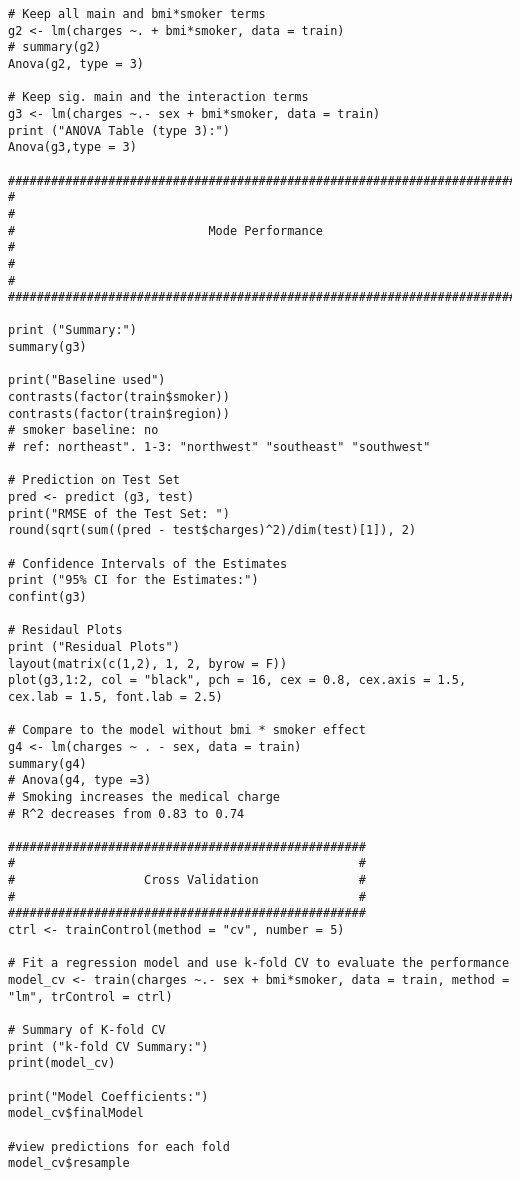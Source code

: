 \documentclass[12pt]{article}
\begin{document}
\begin{verbatim}
# Keep all main and bmi*smoker terms
g2 <- lm(charges ~. + bmi*smoker, data = train)
# summary(g2)
Anova(g2, type = 3)

# Keep sig. main and the interaction terms
g3 <- lm(charges ~.- sex + bmi*smoker, data = train)
print ("ANOVA Table (type 3):")
Anova(g3,type = 3)

#######################################################################
#                                                                     #
#                           Mode Performance                          #
#                                                                     #
#######################################################################

print ("Summary:")
summary(g3)

print("Baseline used")
contrasts(factor(train$smoker))
contrasts(factor(train$region))
# smoker baseline: no
# ref: northeast". 1-3: "northwest" "southeast" "southwest"

# Prediction on Test Set
pred <- predict (g3, test)
print("RMSE of the Test Set: ")
round(sqrt(sum((pred - test$charges)^2)/dim(test)[1]), 2)

# Confidence Intervals of the Estimates
print ("95% CI for the Estimates:")
confint(g3) 

# Residaul Plots
print ("Residual Plots")
layout(matrix(c(1,2), 1, 2, byrow = F)) 
plot(g3,1:2, col = "black", pch = 16, cex = 0.8, cex.axis = 1.5, 
cex.lab = 1.5, font.lab = 2.5)

# Compare to the model without bmi * smoker effect
g4 <- lm(charges ~ . - sex, data = train)
summary(g4)
# Anova(g4, type =3)
# Smoking increases the medical charge
# R^2 decreases from 0.83 to 0.74

##################################################
#                                                #
#                  Cross Validation              # 
#                                                #
##################################################
ctrl <- trainControl(method = "cv", number = 5)

# Fit a regression model and use k-fold CV to evaluate the performance
model_cv <- train(charges ~.- sex + bmi*smoker, data = train, method = "lm", trControl = ctrl)

# Summary of K-fold CV 
print ("k-fold CV Summary:")              
print(model_cv)

print("Model Coefficients:")
model_cv$finalModel

#view predictions for each fold
model_cv$resample
\end{verbatim}
\fi
\end{document}
